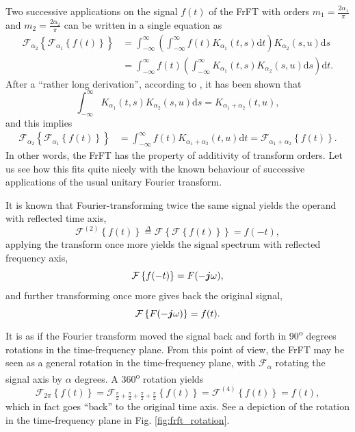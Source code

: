 Two successive applications on the signal $f(t)$ of the FrFT with orders $m_1 = \frac{2\alpha_1}{\pi}$ and $m_2 = \frac{2\alpha_2}{\pi}$ can be written in a single equation as
\begin{align}
\label{eq:frftsucessive}
\mathcal{F}_{\alpha_2} \left\{ \mathcal{F}_{\alpha_1} \left\{ f(t) \right\} \right\} &=
\int_{-\infty}^{\infty} 
\left( \int_{-\infty}^{\infty} f(t) K_{\alpha_1} (t, s) \mathrm{d}t \right)
K_{\alpha_2} (s, u) \mathrm{d}s \\
&= 
\int_{-\infty}^{\infty}
f(t)
\left(
\int_{-\infty}^{\infty}
K_{\alpha_1} (t, s) K_{\alpha_2} (s, u) \mathrm{d}s
\right)
\mathrm{d}t.
\end{align}
After a ``rather long derivation'', according to \cite{almeida1994fractional}, it has been shown that
\begin{equation}
\label{eq:summingangles}
\int_{-\infty}^{\infty}
K_{\alpha_1} (t, s) K_{\alpha_2} (s, u) \mathrm{d}s = 
K_{\alpha_1 + \alpha_2} (t, u),
\end{equation}
and this implies
\begin{align}
\mathcal{F}_{\alpha_2} \left\{ \mathcal{F}_{\alpha_1} \left\{ f(t) \right\} \right\} &=
\int_{-\infty}^{\infty}
f(t)
K_{\alpha_1 + \alpha_2} (t, u)
\mathrm{d}t
= \mathcal{F}_{\alpha_1 + \alpha_2} \left\{ f(t) \right\}.
\end{align}
In other words, the FrFT has the property of additivity of transform orders. Let us see how this fits quite nicely with the known behaviour of successive applications of the usual unitary Fourier transform.

It is known that Fourier-transforming twice the same signal yields the operand with reflected time axis,
\begin{equation}
\mathcal{F}^{(2)} \left\{ f(t) \right\} \overset{\Delta}{=}
\mathcal{F} \left\{ \mathcal{F} \left\{ f(t) \right\} \right\}
= f(-t),
\end{equation}
applying the transform once more yields the signal spectrum with reflected frequency axis,
\begin{equation}
\mathcal{F} \left\{ f(-t) \right\} = F(-\boldsymbol{j} \omega),
\end{equation}
and further transforming once more gives back the original signal,
\begin{equation}
\mathcal{F} \left\{ F(-\boldsymbol{j} \omega) \right\} = f(t).
\end{equation}
It is as if the Fourier transform moved the signal back and forth in 90\textsuperscript{o} degrees rotations in the time-frequency plane. From this point of view, the FrFT may be seen as a general rotation in the time-frequency plane, with $\mathcal{F}_\alpha$ rotating the signal axis by $\alpha$ degrees. A 360\textsuperscript{o} rotation yields
\begin{equation}
\mathcal{F}_{2\pi} \left\{ f(t) \right\} = \mathcal{F}_{
\frac{\pi}{2} + 
\frac{\pi}{2} + 
\frac{\pi}{2} + 
\frac{\pi}{2}
} \left\{ f(t) \right\} =
\mathcal{F}^{(4)} \left\{ f(t) \right\} = f(t),
\end{equation}
which in fact goes ``back'' to the original time axis. See a depiction of the rotation in the time-frequency plane in Fig. \ref{fig:frft_rotation}.

